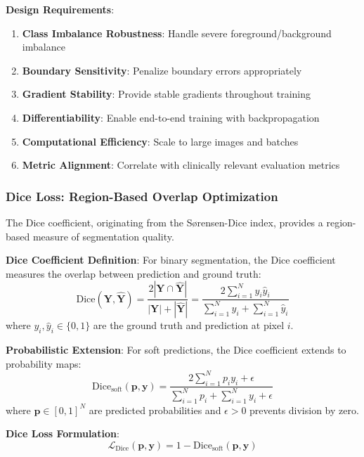 \documentclass[12pt,a4paper]{article}
\begin{document}
\textbf{Design Requirements}:
\begin{enumerate}
    \item \textbf{Class Imbalance Robustness}: Handle severe foreground/background imbalance
    \item \textbf{Boundary Sensitivity}: Penalize boundary errors appropriately
    \item \textbf{Gradient Stability}: Provide stable gradients throughout training
    \item \textbf{Differentiability}: Enable end-to-end training with backpropagation
    \item \textbf{Computational Efficiency}: Scale to large images and batches
    \item \textbf{Metric Alignment}: Correlate with clinically relevant evaluation metrics
\end{enumerate}

\subsubsection{Dice Loss: Region-Based Overlap Optimization}

The Dice coefficient, originating from the Sørensen-Dice index, provides a region-based measure of segmentation quality.

\textbf{Dice Coefficient Definition}:
For binary segmentation, the Dice coefficient measures the overlap between prediction and ground truth:
\begin{equation}
\text{Dice}(\mathbf{Y}, \mathbf{\hat{Y}}) = \frac{2|\mathbf{Y} \cap \mathbf{\hat{Y}}|}{|\mathbf{Y}| + |\mathbf{\hat{Y}}|} = \frac{2 \sum_{i=1}^N y_i \hat{y}_i}{\sum_{i=1}^N y_i + \sum_{i=1}^N \hat{y}_i}
\end{equation}
where $y_i, \hat{y}_i \in \{0, 1\}$ are the ground truth and prediction at pixel $i$.

\textbf{Probabilistic Extension}:
For soft predictions, the Dice coefficient extends to probability maps:
\begin{equation}
\text{Dice}_{\text{soft}}(\mathbf{p}, \mathbf{y}) = \frac{2 \sum_{i=1}^N p_i y_i + \epsilon}{\sum_{i=1}^N p_i + \sum_{i=1}^N y_i + \epsilon}
\end{equation}
where $\mathbf{p} \in [0,1]^N$ are predicted probabilities and $\epsilon > 0$ prevents division by zero.

\textbf{Dice Loss Formulation}:
\begin{equation}
\mathcal{L}_{\text{Dice}}(\mathbf{p}, \mathbf{y}) = 1 - \text{Dice}_{\text{soft}}(\mathbf{p}, \mathbf{y})
\end{equation}
\end{document}
